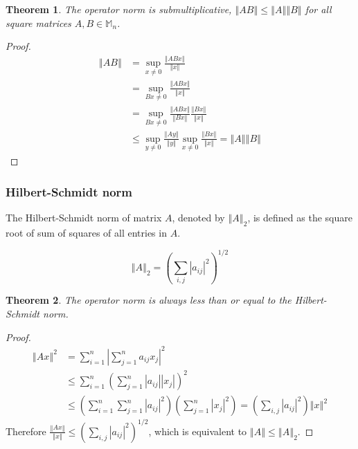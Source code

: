 \documentclass[twofold]{article}
\newcommand*\norm[1]{\left \Vert #1 \right\Vert}
\newcommand*\abs[1]{\left \vert #1 \right\vert}
\theoremstyle{plain}
\newtheorem{theorem}{Theorem}
\theoremstyle{definition}
\theoremstyle{remark}
\begin{document}
\begin{theorem}\label{submulti} The operator norm is submultiplicative,  \(\norm{AB} \le \norm{A} \norm{B}\) for all square matrices \(A, B \in \mathbb{M}_n\). \end{theorem}
\begin{proof} \begin{equation*} \begin{split}
 \norm{AB} & = \sup_{x \ne 0} \frac{\norm{ABx}}{\norm{x}}\\
 & = \sup_{Bx \ne 0} \frac{\norm{ABx}}{\norm{x}} \\
& = \sup_{Bx \ne 0} \frac{\norm{ABx}}{\norm{Bx}} \frac{\norm{Bx}}{\norm{x}} \\
& \le \sup_{y \ne 0} \frac{\norm{Ay}}{\norm{y}} \sup_{x \ne 0} \frac{\norm{Bx}}{\norm{x}} = \norm{A} \norm{B} 
\end{split} \end{equation*}\end{proof}

\subsubsection{Hilbert-Schmidt norm}

The Hilbert-Schmidt norm of matrix \(A\), denoted by \(\norm{A}_2\),  is defined as the square root of sum of squares of all entries in \(A\). 

 \[\norm{A}_2 = \left( \sum_{i, j} \abs{a_{ij}}^2 \right) ^{1/2}\]


\begin{theorem} The operator norm is always less than or equal to the Hilbert-Schmidt norm. \end{theorem}
\begin{proof}
 \begin{equation*} \begin{split} 
\norm{Ax}^2 & = \sum_{i = 1} ^ n \abs{\sum_{j = 1} ^ n a_{ij} x_j}^2 \\
& \le  \sum_{i = 1} ^ n \left( \sum_{j = 1} ^ n \abs{a_{ij}} \abs{ x_j}\right) ^2 \\
& \le \left( \sum_{i = 1}^n \sum_{j = 1}^n \abs{a_{ij}}^2\right) \left( \sum_{j=1}^n \abs{x_j}^2 \right)  = \left( \sum_{i, j} \abs{a_{ij}}^2 \right) \norm{x}^2
\end{split}
\end{equation*} 
Therefore \(\displaystyle \frac{\norm{Ax}}{\norm{x}} \le \left( \sum_{i, j} \abs{a_{ij}}^2 \right) ^{1/2}\), which is equivalent to \(\norm{A} \le \norm{A}_2\).
\end{proof}
\end{document}
